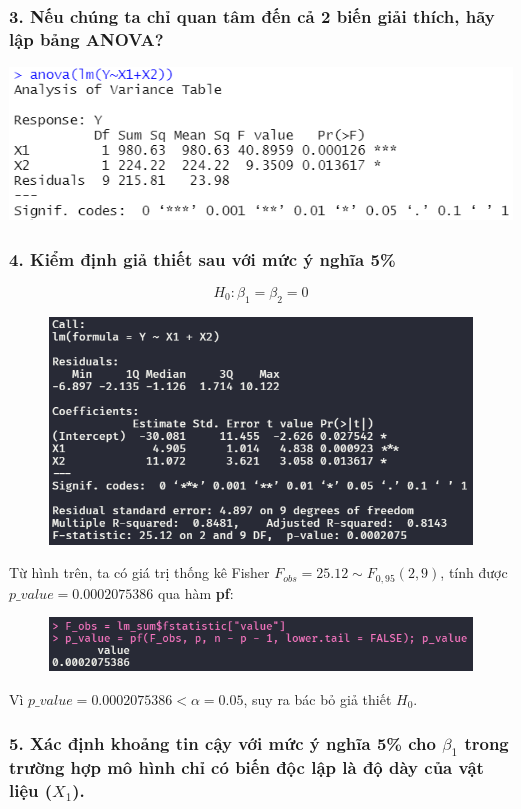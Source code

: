 \documentclass[a4paper]{article}
\theoremstyle{nonumberplain}
\begin{document}
\subsubsection*{3. Nếu chúng ta chỉ quan tâm đến cả 2 biến giải thích, hãy lập bảng ANOVA?}
\begin{center}
\includegraphics{bai2_3.PNG} 
\end{center}

\subsubsection*{4. Kiểm định giả thiết sau với mức ý nghĩa 5\%}
\[H_0 : \beta_1 = \beta_2= 0\]

\begin{figure}[h]
	\centering
	\includegraphics[width=0.7\linewidth]{bai-2-4-summary}
	\label{fig:bai-2-4-summary}
\end{figure}

Từ hình trên, ta có giá trị thống kê Fisher $F_{obs} = 25.12 \sim F_{0,95}(2,9)$, tính được $p\_value = 0.0002075386$ qua hàm \textbf{pf}:
\begin{figure}[h]
	\centering
	\includegraphics[width=0.7\linewidth]{bai-2-4-p_value}
	\label{fig:bai-2-4-pvalue}
\end{figure}

Vì $p\_value = 0.0002075386 < \alpha = 0.05$, suy ra bác bỏ giả thiết $H_0$.

\subsubsection*{5. Xác định khoảng tin cậy với mức ý nghĩa 5\% cho $\beta_1$ trong trường hợp mô hình chỉ có biến độc lập là độ dày của vật liệu ($X_1$).}
\end{document}
